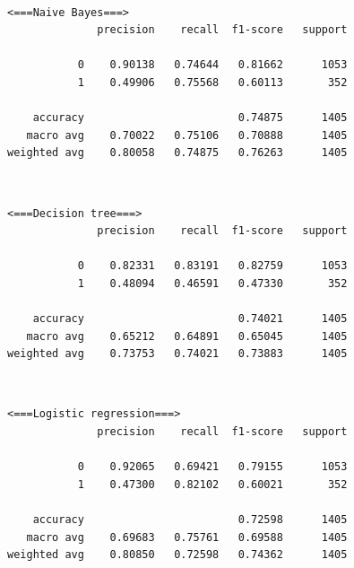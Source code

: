 \documentclass[11pt]{article}
\begin{document}
    \begin{center}
    \end{center}
    { \hspace*{\fill} \\}
    
    \begin{Verbatim}[commandchars=\\\{\}]
 <===Naive Bayes===>
              precision    recall  f1-score   support

           0    0.90138   0.74644   0.81662      1053
           1    0.49906   0.75568   0.60113       352

    accuracy                        0.74875      1405
   macro avg    0.70022   0.75106   0.70888      1405
weighted avg    0.80058   0.74875   0.76263      1405

    \end{Verbatim}

    \begin{center}
    \end{center}
    { \hspace*{\fill} \\}
    
    \begin{Verbatim}[commandchars=\\\{\}]
 <===Decision tree===>
              precision    recall  f1-score   support

           0    0.82331   0.83191   0.82759      1053
           1    0.48094   0.46591   0.47330       352

    accuracy                        0.74021      1405
   macro avg    0.65212   0.64891   0.65045      1405
weighted avg    0.73753   0.74021   0.73883      1405

    \end{Verbatim}

    \begin{center}
    \end{center}
    { \hspace*{\fill} \\}
    
    \begin{Verbatim}[commandchars=\\\{\}]
 <===Logistic regression===>
              precision    recall  f1-score   support

           0    0.92065   0.69421   0.79155      1053
           1    0.47300   0.82102   0.60021       352

    accuracy                        0.72598      1405
   macro avg    0.69683   0.75761   0.69588      1405
weighted avg    0.80850   0.72598   0.74362      1405

    \end{Verbatim}
\end{document}
